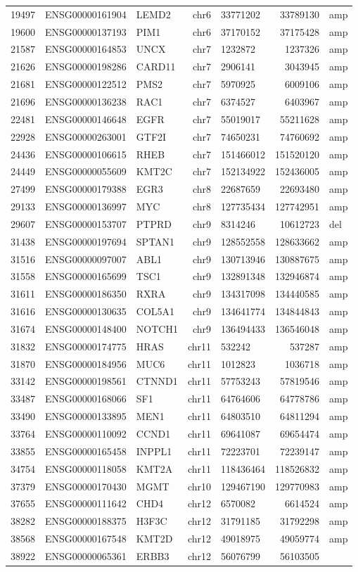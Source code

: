 \documentclass[]{article}
\begin{document}
\begin{longtable}[]{@{}rrlrlrl@{}}
19497 & ENSG00000161904 & LEMD2 & chr6 & 33771202 & 33789130 &
amp\tabularnewline
19600 & ENSG00000137193 & PIM1 & chr6 & 37170152 & 37175428 &
amp\tabularnewline
21587 & ENSG00000164853 & UNCX & chr7 & 1232872 & 1237326 &
amp\tabularnewline
21626 & ENSG00000198286 & CARD11 & chr7 & 2906141 & 3043945 &
amp\tabularnewline
21681 & ENSG00000122512 & PMS2 & chr7 & 5970925 & 6009106 &
amp\tabularnewline
21696 & ENSG00000136238 & RAC1 & chr7 & 6374527 & 6403967 &
amp\tabularnewline
22481 & ENSG00000146648 & EGFR & chr7 & 55019017 & 55211628 &
amp\tabularnewline
22928 & ENSG00000263001 & GTF2I & chr7 & 74650231 & 74760692 &
amp\tabularnewline
24436 & ENSG00000106615 & RHEB & chr7 & 151466012 & 151520120 &
amp\tabularnewline
24449 & ENSG00000055609 & KMT2C & chr7 & 152134922 & 152436005 &
amp\tabularnewline
27499 & ENSG00000179388 & EGR3 & chr8 & 22687659 & 22693480 &
amp\tabularnewline
29133 & ENSG00000136997 & MYC & chr8 & 127735434 & 127742951 &
amp\tabularnewline
29607 & ENSG00000153707 & PTPRD & chr9 & 8314246 & 10612723 &
del\tabularnewline
31438 & ENSG00000197694 & SPTAN1 & chr9 & 128552558 & 128633662 &
amp\tabularnewline
31516 & ENSG00000097007 & ABL1 & chr9 & 130713946 & 130887675 &
amp\tabularnewline
31558 & ENSG00000165699 & TSC1 & chr9 & 132891348 & 132946874 &
amp\tabularnewline
31611 & ENSG00000186350 & RXRA & chr9 & 134317098 & 134440585 &
amp\tabularnewline
31616 & ENSG00000130635 & COL5A1 & chr9 & 134641774 & 134844843 &
amp\tabularnewline
31674 & ENSG00000148400 & NOTCH1 & chr9 & 136494433 & 136546048 &
amp\tabularnewline
31832 & ENSG00000174775 & HRAS & chr11 & 532242 & 537287 &
amp\tabularnewline
31870 & ENSG00000184956 & MUC6 & chr11 & 1012823 & 1036718 &
amp\tabularnewline
33142 & ENSG00000198561 & CTNND1 & chr11 & 57753243 & 57819546 &
amp\tabularnewline
33487 & ENSG00000168066 & SF1 & chr11 & 64764606 & 64778786 &
amp\tabularnewline
33490 & ENSG00000133895 & MEN1 & chr11 & 64803510 & 64811294 &
amp\tabularnewline
33764 & ENSG00000110092 & CCND1 & chr11 & 69641087 & 69654474 &
amp\tabularnewline
33855 & ENSG00000165458 & INPPL1 & chr11 & 72223701 & 72239147 &
amp\tabularnewline
34754 & ENSG00000118058 & KMT2A & chr11 & 118436464 & 118526832 &
amp\tabularnewline
37379 & ENSG00000170430 & MGMT & chr10 & 129467190 & 129770983 &
amp\tabularnewline
37655 & ENSG00000111642 & CHD4 & chr12 & 6570082 & 6614524 &
amp\tabularnewline
38282 & ENSG00000188375 & H3F3C & chr12 & 31791185 & 31792298 &
amp\tabularnewline
38568 & ENSG00000167548 & KMT2D & chr12 & 49018975 & 49059774 &
amp\tabularnewline
38922 & ENSG00000065361 & ERBB3 & chr12 & 56076799 & 56103505 &

\end{longtable}
\end{document}

